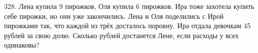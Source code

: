 328. Лена купила 9 пирожков, Оля купила 6 пирожков. Ира тоже захотела купить себе пирожки, но они уже закончились. Лена и Оля поделились с Ирой пирожками так,
что каждой из трёх досталось поровну. Ира отдала девочкам 45 рублей за свою долю. Сколько рублей достанется Лене, если расходы у всех одинаковы?\\
